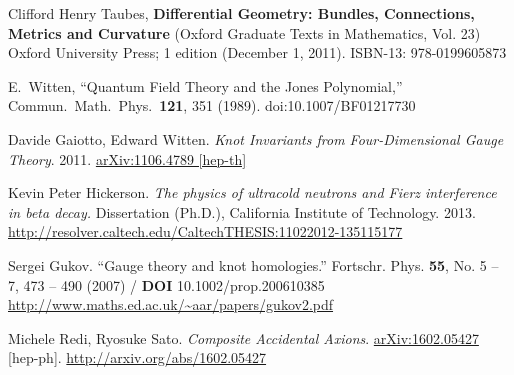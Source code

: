 \documentclass[10pt]{amsart}
\begin{document}
\begin{thebibliography}{9}

Clifford Henry Taubes, \textbf{Differential Geometry: Bundles, Connections, Metrics and Curvature} (Oxford Graduate Texts in Mathematics, Vol. 23) Oxford University Press; 1 edition (December 1, 2011). ISBN-13: 978-0199605873


  E.~Witten,
  ``Quantum Field Theory and the Jones Polynomial,''
  Commun.\ Math.\ Phys.\  {\bf 121}, 351 (1989).
  doi:10.1007/BF01217730


Davide Gaiotto, Edward Witten. \emph{Knot Invariants from Four-Dimensional Gauge Theory}. 2011.   \href{http://arxiv.org/abs/1106.4789}{arXiv:1106.4789 [hep-th]}


Kevin Peter Hickerson.  \emph{The physics of ultracold neutrons and Fierz interference in beta decay.}  Dissertation (Ph.D.), California Institute of Technology. 2013.  \url{http://resolver.caltech.edu/CaltechTHESIS:11022012-135115177}


Sergei Gukov.  ``Gauge theory and knot homologies.''  Fortschr. Phys. \textbf{55}, No. 5 – 7, 473 – 490 (2007) / \textbf{DOI} 10.1002/prop.200610385  \url{http://www.maths.ed.ac.uk/~aar/papers/gukov2.pdf}


Michele Redi, Ryosuke Sato. \emph{Composite Accidental Axions}. \href{arXiv:1602.05427 [hep-ph]}{arXiv:1602.05427} [hep-ph].  \url{http://arxiv.org/abs/1602.05427}


\end{thebibliography}
\end{document}
